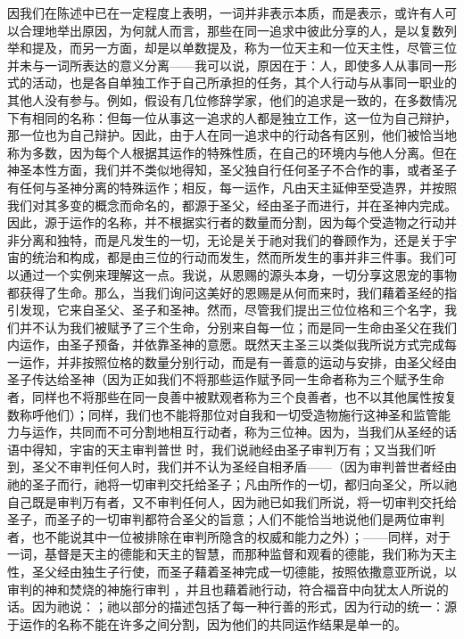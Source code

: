 因我们在陈述中已在一定程度上表明，一词并非表示本质，而是表示，或许有人可以合理地举出原因，为何就人而言，那些在同一追求中彼此分享的人，是以复数列举和提及，而另一方面，却是以单数提及，称为一位天主和一位天主性，尽管三位并未与一词所表达的意义分离——我可以说，原因在于：人，即使多人从事同一形式的活动，也是各自单独工作于自己所承担的任务，其个人行动与从事同一职业的其他人没有参与。例如，假设有几位修辞学家，他们的追求是一致的，在多数情况下有相同的名称：但每一位从事这一追求的人都是独立工作，这一位为自己辩护，那一位也为自己辩护。因此，由于人在同一追求中的行动各有区别，他们被恰当地称为多数，因为每个人根据其运作的特殊性质，在自己的环境内与他人分离。但在神圣本性方面，我们并不类似地得知，圣父独自行任何圣子不合作的事，或者圣子有任何与圣神分离的特殊运作；相反，每一运作，凡由天主延伸至受造界，并按照我们对其多变的概念而命名的，都源于圣父，经由圣子而进行，并在圣神内完成。因此，源于运作的名称，并不根据实行者的数量而分割，因为每个受造物之行动并非分离和独特，而是凡发生的一切，无论是关于祂对我们的眷顾作为，还是关于宇宙的统治和构成，都是由三位的行动而发生，然而所发生的事并非三件事。我们可以通过一个实例来理解这一点。我说，从恩赐的源头本身，一切分享这恩宠的事物都获得了生命。那么，当我们询问这美好的恩赐是从何而来时，我们藉着圣经的指引发现，它来自圣父、圣子和圣神。然而，尽管我们提出三位位格和三个名字，我们并不认为我们被赋予了三个生命，分别来自每一位；而是同一生命由圣父在我们内运作，由圣子预备，并依靠圣神的意愿。既然天主圣三以类似我所说方式完成每一运作，并非按照位格的数量分别行动，而是有一善意的运动与安排，由圣父经由圣子传达给圣神（因为正如我们不将那些运作赋予同一生命者称为三个赋予生命者，同样也不将那些在同一良善中被默观者称为三个良善者，也不以其他属性按复数称呼他们）；同样，我们也不能将那位对自我和一切受造物施行这神圣和监管能力与运作，共同而不可分割地相互行动者，称为三位神。因为，当我们从圣经的话语中得知，宇宙的天主审判普世  时，我们说祂经由圣子审判万有；又当我们听到，圣父不审判任何人时，我们并不认为圣经自相矛盾——（因为审判普世者经由祂的圣子而行，祂将一切审判交托给圣子；凡由所作的一切，都归向圣父，所以祂自己既是审判万有者，又不审判任何人，因为祂已如我们所说，将一切审判交托给圣子，而圣子的一切审判都符合圣父的旨意；人们不能恰当地说他们是两位审判者，也不能说其中一位被排除在审判所隐含的权威和能力之外）；——同样，对于一词，基督是天主的德能和天主的智慧，而那种监督和观看的德能，我们称为天主性，圣父经由独生子行使，而圣子藉着圣神完成一切德能，按照依撒意亚所说，以审判的神和焚烧的神施行审判 ，并且也藉着祂行动，符合福音中向犹太人所说的话。因为祂说：；祂以部分的描述包括了每一种行善的形式，因为行动的统一：源于运作的名称不能在许多之间分割，因为他们的共同运作结果是单一的。\par

